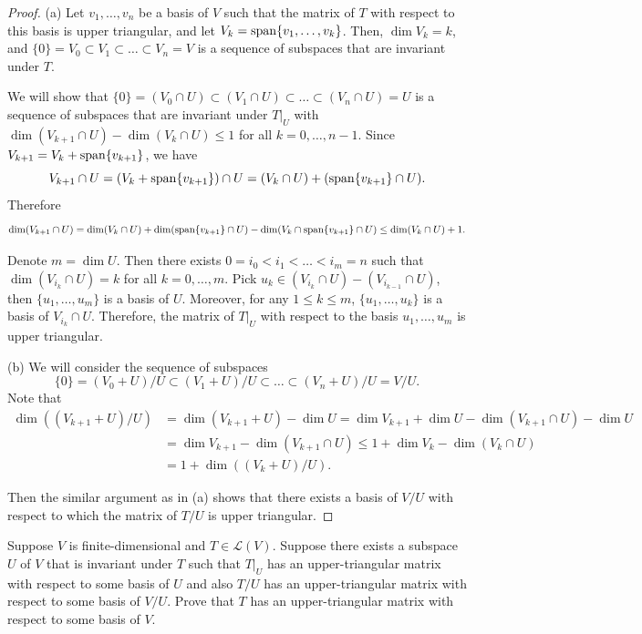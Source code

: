 \documentclass{article}
\begin{document}
\begin{proof}
  (a) Let \( v_1,\dots,v_n \) be a basis of \( V \) such that the matrix of \( T \) with respect to this basis is upper triangular, and let \( V_k=\operatorname{span}\{v_1,\dots,v_k\} \). Then, \( \dim V_k=k \), and \( \{0\}=V_0\subset V_1\subset\dots\subset V_n=V \) is a sequence of subspaces that are invariant under \( T \).\par
  We will show that \( \{0\}=(V_0\cap U)\subset (V_1\cap U)\subset\dots\subset (V_n\cap U)=U \) is a sequence of subspaces that are invariant under \( T|_U \) with \( \dim (V_{k+1}\cap U)-\dim (V_k\cap U)\le 1 \) for all \( k=0,\dots,n-1 \). Since \( V_{k+1} = V_k + \operatorname{span}\{v_{k+1}\} \), we have
  \[ V_{k+1}\cap U = (V_k + \operatorname{span}\{v_{k+1}\})\cap U = (V_k\cap U) + (\operatorname{span}\{v_{k+1}\}\cap U). \]
  Therefore
  \[ \dim(V_{k+1}\cap U)=\dim(V_k\cap U)+\dim(\operatorname{span}\{v_{k+1}\}\cap U)-\dim(V_k\cap\operatorname{span}\{v_{k+1}\}\cap U)\le\dim(V_k\cap U)+1. \]\par
  Denote \( m=\dim U \). Then there exists \( 0=i_0<i_1<\dots<i_m=n \) such that \( \dim(V_{i_k}\cap U)=k \) for all \( k=0,\dots,m \). Pick \( u_k\in (V_{i_k}\cap U)-(V_{i_{k-1}}\cap U) \), then \( \{u_1,\dots,u_m\} \) is a basis of \( U \). Moreover, for any \( 1\le k\le m \), \( \{u_1,\dots,u_k\} \) is a basis of \( V_{i_k}\cap U \). Therefore, the matrix of \( T|_U \) with respect to the basis \( u_1,\dots,u_m \) is upper triangular.\par
  (b) We will consider the sequence of subspaces
  \[ \{0\}=(V_0+U)/U\subset (V_1+U)/U\subset\dots\subset (V_n+U)/U=V/U. \]
  Note that
  \begin{align*}
    \dim \left( (V_{k+1}+U)/U \right) &= \dim (V_{k+1}+U) - \dim U 
    = \dim V_{k+1} + \dim U - \dim (V_{k+1}\cap U) - \dim U \\
    &= \dim V_{k+1} - \dim (V_{k+1}\cap U) 
    \le 1+\dim V_k - \dim (V_k\cap U) \\
    &= 1+\dim \left( (V_k+U)/U \right).
  \end{align*}\par
  Then the similar argument as in (a) shows that there exists a basis of \( V/U \) with respect to which the matrix of \( T/U \) is upper triangular.
\end{proof}



\begin{problem}[5C-13]
Suppose $V$ is finite-dimensional and $T \in \mathcal{L}(V)$. Suppose there exists a subspace $U$ of $V$ that is invariant under $T$ such that $T|_U$ has an upper-triangular matrix with respect to some basis of $U$ and also $T/U$ has an upper-triangular matrix with respect to some basis of $V/U$. Prove that $T$ has an upper-triangular matrix with respect to some basis of $V$.
\end{problem}
\end{document}
